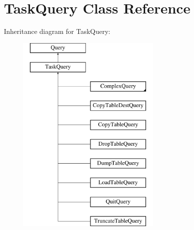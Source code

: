 \hypertarget{class_task_query}{}\section{Task\+Query Class Reference}
\label{class_task_query}
Inheritance diagram for Task\+Query\+:\begin{figure}[H]
\begin{center}
\leavevmode
\includegraphics[height=10.000000cm]{class_task_query}
\end{center}
\end{figure}
